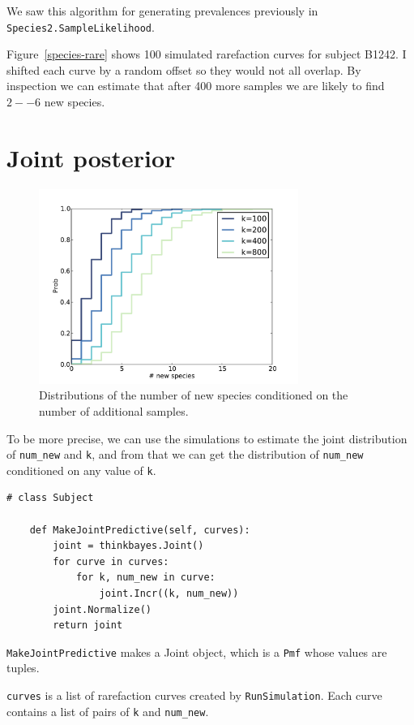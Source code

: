 \documentclass[12pt]{book}
\begin{document}
We saw this algorithm for generating prevalences previously
in {\tt Species2.SampleLikelihood}.

Figure~\ref{species-rare} shows 100 simulated rarefaction curves
for subject B1242.  I shifted each curve by a random offset so they
would not all overlap.  By inspection we can estimate that after
400 more samples we are likely to find $2--6$ new species.


\section{Joint posterior}

\begin{figure}
\centerline{\includegraphics[height=2.5in]{figs/species-cond-B1242.pdf}}
\caption{Distributions of the number of new species conditioned on
the number of additional samples.}
\label{species-cond}
\end{figure}

To be more precise, we can use the simulations to estimate the
joint distribution of \verb"num_new" and {\tt k}, and from that
we can get the distribution of \verb"num_new" conditioned on any
value of {\tt k}.

\begin{verbatim}
# class Subject

    def MakeJointPredictive(self, curves):
        joint = thinkbayes.Joint()
        for curve in curves:
            for k, num_new in curve:
                joint.Incr((k, num_new))
        joint.Normalize()
        return joint
\end{verbatim}

{\tt MakeJointPredictive} makes a Joint object, which is a
{\tt Pmf} whose values are tuples.

{\tt curves} is a list of rarefaction curves created by
{\tt RunSimulation}.  Each curve contains a list of pairs of
{\tt k} and \verb"num_new".
\end{document}
